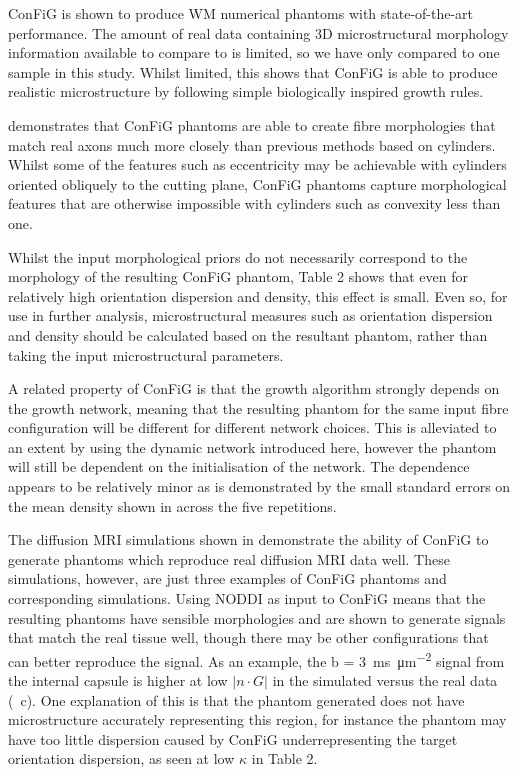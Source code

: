 ConFiG is shown to produce \ac{WM} numerical phantoms with state-of-the-art performance. The amount of real data containing 3D microstructural morphology information available to compare to is limited, so we have only compared to one sample in this study. Whilst limited, this shows that \ac{ConFiG} is able to produce realistic microstructure by following simple biologically inspired growth rules.

 demonstrates that \ac{ConFiG} phantoms are able to create fibre morphologies that match real axons much more closely than previous methods based on cylinders. Whilst some of the features such as eccentricity may be achievable with cylinders oriented obliquely to the cutting plane, \ac{ConFiG} phantoms capture morphological features that are otherwise impossible with cylinders such as convexity less than one.

Whilst the input morphological priors do not necessarily correspond to the morphology of the resulting \ac{ConFiG} phantom, Table 2 shows that even for relatively high orientation dispersion and density, this effect is small. Even so, for use in further analysis, microstructural measures such as orientation dispersion and density should be calculated based on the resultant phantom, rather than taking the input microstructural parameters.

A related property of \ac{ConFiG} is that the growth algorithm strongly depends on the growth network, meaning that the resulting phantom for the same input fibre configuration will be different for different network choices. This is alleviated to an extent by using the dynamic network introduced here, however the phantom will still be dependent on the initialisation of the network. The dependence appears to be relatively minor as is demonstrated by the small standard errors on the mean density shown in  across the five repetitions.

The diffusion \ac{MRI} simulations shown in  demonstrate the ability of \ac{ConFiG} to generate phantoms which reproduce real diffusion \ac{MRI} data well. These simulations, however, are just three examples of \ac{ConFiG} phantoms and corresponding simulations. Using \ac{NODDI} as input to \ac{ConFiG} means that the resulting phantoms have sensible morphologies and are shown to generate signals that match the real tissue well, though there may be other configurations that can better reproduce the signal. As an example, the b = \SI{3}{\milli\second\per\micro\metre\squared} signal from the internal capsule is higher at low $|n\cdot G|$ in the simulated versus the real data (~c). One explanation of this is that the phantom generated does not have microstructure accurately representing this region, for instance the phantom may have too little dispersion caused by \ac{ConFiG} underrepresenting the target orientation dispersion, as seen at low $\kappa$ in Table 2.

